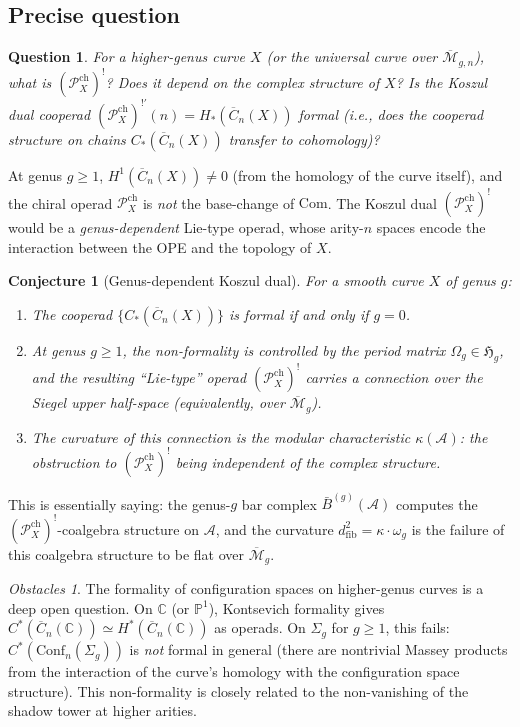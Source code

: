 \documentclass[11pt]{article}
\newtheorem{conjecture}{Conjecture}
\newtheorem{question}{Question}
\theoremstyle{definition}
\theoremstyle{remark}
\newtheorem*{obstacle}{Obstacles}
\newcommand{\Pch}{\mathcal{P}^{\mathrm{ch}}}
\newcommand{\Mbar}{\overline{\mathcal{M}}}
\newcommand{\FM}{\overline{C}}
\newcommand{\cA}{\mathcal{A}}
\begin{document}
\subsection{Precise question}

\begin{question}
For a higher-genus curve $X$ (or the universal curve over
$\Mbar_{g,n}$), what is $(\Pch_X)^!$?  Does it depend on the
complex structure of $X$?  Is the Koszul dual cooperad
$(\Pch_X)^{!\prime}(n) = H_*(\FM_n(X))$ formal
(i.e., does the cooperad structure on chains $C_*(\FM_n(X))$
transfer to cohomology)?
\end{question}

At genus $g \geq 1$, $H^1(\FM_n(X)) \neq 0$ (from the homology of
the curve itself), and the chiral operad $\Pch_X$ is \emph{not}
the base-change of $\mathrm{Com}$.  The Koszul dual
$(\Pch_X)^!$ would be a \emph{genus-dependent} Lie-type operad,
whose arity-$n$ spaces encode the interaction between the OPE and
the topology of $X$.

\begin{conjecture}[Genus-dependent Koszul dual]
\label{conj:genus-koszul-dual}
For a smooth curve $X$ of genus $g$:
\begin{enumerate}
\item The cooperad $\{C_*(\FM_n(X))\}$ is formal if and only if
$g = 0$.
\item At genus $g \geq 1$, the non-formality is controlled by the
period matrix $\Omega_g \in \mathfrak{H}_g$, and the resulting
``Lie-type'' operad $(\Pch_X)^!$ carries a connection over the
Siegel upper half-space (equivalently, over $\Mbar_g$).
\item The curvature of this connection is the modular characteristic
$\kappa(\cA)$: the obstruction to $(\Pch_X)^!$ being independent
of the complex structure.
\end{enumerate}
\end{conjecture}

This is essentially saying: the genus-$g$ bar complex
$\bar{B}^{(g)}(\cA)$ computes the $(\Pch_X)^!$-coalgebra
structure on $\cA$, and the curvature
$d_{\mathrm{fib}}^2 = \kappa \cdot \omega_g$ is the failure of
this coalgebra structure to be flat over $\Mbar_g$.

\begin{obstacle}
The formality of configuration spaces on higher-genus curves is a
deep open question.  On $\mathbb{C}$ (or $\mathbb{P}^1$),
Kontsevich formality gives $C^*(\FM_n(\mathbb{C})) \simeq
H^*(\FM_n(\mathbb{C}))$ as operads.  On $\Sigma_g$ for $g \geq 1$,
this fails: $C^*(\mathrm{Conf}_n(\Sigma_g))$ is \emph{not} formal
in general (there are nontrivial Massey products from the
interaction of the curve's homology with the configuration space
structure).  This non-formality is closely related to the
non-vanishing of the shadow tower at higher arities.
\end{obstacle}
\end{document}
